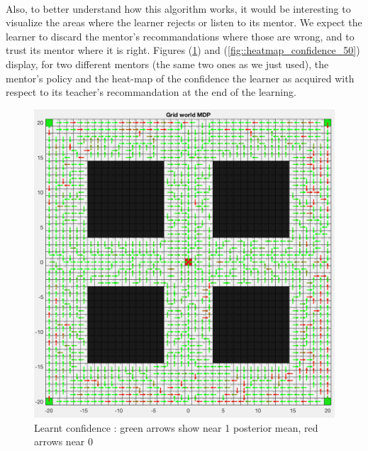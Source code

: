 \documentclass[a4paper]{report}
\begin{document}
{{{{				\paragraph{} Also, to better understand how this algorithm works, it would be interesting to visualize the areas where the learner rejects or listen to its mentor. We expect the learner to discard the mentor's recommandations where those are wrong, and to trust its mentor where it is right. Figures (\ref{fig::heatmap_confidence_120}) and (\ref{fig::heatmap_confidence_50}) display, for two different mentors (the same two ones as we just used), the mentor's policy and the heat-map of the confidence the learner as acquired with respect to its teacher's recommandation at the end of the learning. 
				
				 \begin{figure}[ht!]
					\begin{minipage}{0.5\linewidth}
						\begin{center}
							\includegraphics[width=0.95\linewidth]{heatmap_confidence_120}
							\caption{Learnt confidence : green arrows show near 1 posterior mean, red arrows near 0}
							\label{fig::heatmap_confidence_120}
						\end{center}
					\end{minipage}
					\begin{minipage}{0.5\linewidth}

\end{minipage}
\end{figure}}}}}
\end{document}
